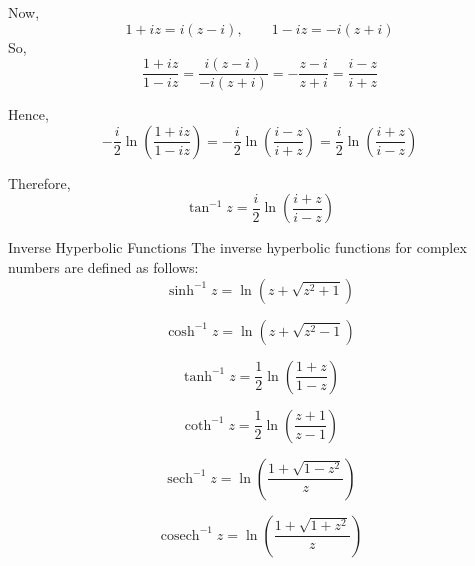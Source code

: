 \documentclass[11pt]{beamer}
\theoremstyle{definition}
\theoremstyle{plain}
\begin{document}
\begin{frame}
Now,
\[
1+iz=i(z-i),\qquad 1-iz=-i(z+i)
\]
So,
\[
\frac{1+iz}{1-iz}
=
\frac{i(z-i)}{-i(z+i)}
=
-\frac{z-i}{z+i}
=
\frac{i-z}{i+z}
\]

Hence,
\[
-\frac{i}{2}\ln\left(\frac{1+iz}{1-iz}\right)
=-\frac{i}{2}\ln\left(\frac{i-z}{i+z}\right)
= \frac{i}{2}\ln\left(\frac{i+z}{i-z}\right)
\]

Therefore,
\[
\boxed{
\tan^{-1}z=\frac{i}{2}\ln\left(\frac{i+z}{i-z}\right)
}
\]
\end{frame}
\begin{frame}{Inverse Hyperbolic Functions}
The inverse hyperbolic functions for complex numbers are defined as follows:
\[
\sinh^{-1} z = \ln\left( z + \sqrt{z^2 + 1} \right)
\]

\[
\cosh^{-1} z = \ln\left( z + \sqrt{z^2 - 1} \right)
\]

\[
\tanh^{-1} z = \frac{1}{2}\ln\left( \frac{1+z}{1-z} \right)
\]

\[
\coth^{-1} z = \frac{1}{2}\ln\left( \frac{z+1}{z-1} \right)
\]

\[
\operatorname{sech}^{-1} z = \ln\left( \frac{1+\sqrt{1-z^2}}{z} \right)
\]

\[
\operatorname{cosech}^{-1} z = \ln\left( \frac{1+\sqrt{1+z^2}}{z} \right)
\]
\end{frame}
\end{document}
